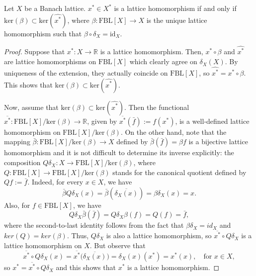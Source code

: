 \documentclass[10pt,a4paper]{amsart}
\newcommand{\fbl}{\text{FBL}}
\begin{document}
\begin{prop}\label{prop:kernel-zero}
    Let $X$ be a Banach lattice. $x^*\in X^*$ is a lattice homomorphism if and only if $\text{ker}(\beta)\subset \text{ker}(\widehat{x^*})$, where $\beta:\fbl[X]\to X$ is the unique lattice homomorphism such that $\beta\circ\delta_X=\text{id}_X$.
\end{prop}

\begin{proof}
Suppose that $x^*:X\to\mathbb{R}$ is a lattice homomorphism. Then, $x^*\circ\beta$ and $\widehat{x^*}$ are lattice homomorphisms on $\fbl[X]$ which clearly agree on $\delta_X(X)$. By uniqueness of the extension, they actually coincide on $\fbl[X]$, so $\widehat{x^*}=x^*\circ\beta$. This shows that $\text{ker}(\beta)\subset\text{ker}(\widehat{x^*})$.

Now, assume that $\text{ker}(\beta)\subset\text{ker}(\widehat{x^*})$. Then the functional $\overline{x^*}:\fbl[X]/\text{ker}(\beta)\to \mathbb{R}$, given by $\overline{x^*}(\bar{f}):=f(x^*)$, is a well-defined lattice homomorphism on $\fbl[X]/\text{ker}(\beta)$. On the other hand, note that the mapping $\bar{\beta}:\fbl[X]/\text{ker}(\beta)\to X$ defined by $\bar{\beta}(\bar{f})=\beta f$ is a bijective lattice homomorphism and it is not difficult to determine its inverse explicitly: the composition $Q\delta_X:X\to\fbl[X]/\text{ker}(\beta)$, where $Q:\fbl[X]\to \fbl[X]/\text{ker}(\beta)$ stands for the canonical quotient defined by $Qf:=\bar{f}$. Indeed, for every $x\in X$, we have
$$
\bar{\beta}Q\delta_X(x)=\bar{\beta}(\overline{\delta_X(x)})=\beta\delta_X(x)=x.
$$
Also, for $f\in\fbl[X]$, we have
$$
Q\delta_X\bar{\beta} (\bar{f})=Q\delta_X\beta (f)=Q(f)=\bar{f},
$$
where the second-to-last identity follows from the fact that $\beta\delta_X=id_X$ and $ker(Q)=ker(\beta)$. Thus, $Q\delta_X$ is also a lattice homomorphism, so $\overline{x^*}\circ Q\delta_X$ is a lattice homomorphism on $X$. But observe that
$$
\overline{x^*}\circ Q\delta_X(x)=\overline{x^*}\bigl(\overline{\delta_X(x)}\bigr)=\delta_X(x)(x^*)=x^*(x),\quad \text{for } x\in X,
$$
so $x^*=\overline{x^*}\circ Q\delta_X$ and this shows that $x^*$ is a lattice homomorphism.
\end{proof}
\end{document}
